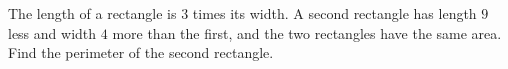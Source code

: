 The length of a rectangle is $3$ times its width. A second rectangle has length $9$ less and width $4$ more than the first, and the two rectangles have the same area. Find the perimeter of the second rectangle.
